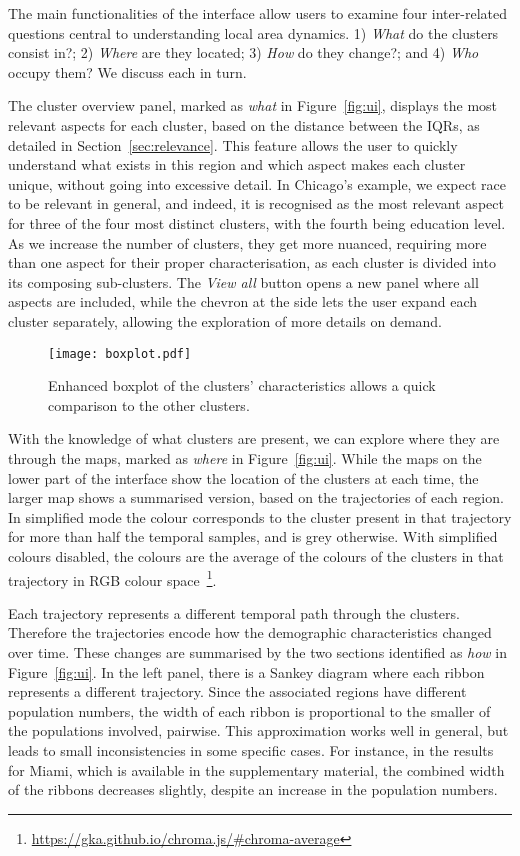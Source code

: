 The main functionalities of the interface allow users to examine four
inter-related questions central to understanding local area dynamics. 1)
\emph{What} do the clusters consist in?; 2) \emph{Where} are they located; 3)
\emph{How} do they change?; and 4) \emph{Who} occupy them? We discuss each in
turn.  

The cluster overview panel, marked as \emph{what} in Figure~\ref{fig:ui},
displays the most relevant aspects for each cluster, based on the distance
between the IQRs, as detailed in Section~\ref{sec:relevance}. This
feature allows the user to quickly understand what exists in this region and
which aspect makes each cluster unique, without going into excessive detail. In
Chicago's example, we expect race to be relevant in general, and indeed, it is
recognised as the most relevant aspect for three of the four most distinct
clusters, with the fourth being education level. As we increase the number of
clusters, they get more nuanced, requiring more than one aspect for their proper
characterisation, as each cluster is divided into its composing sub-clusters.
The \emph{View all} button opens a new panel where all aspects are included,
while the chevron at the side lets the user expand each cluster separately,
allowing the exploration of more details on demand.


\begin{figure}
    \centering 
    \texttt{[image: boxplot.pdf]}
    \caption{Enhanced boxplot of the clusters' characteristics allows a quick
    comparison to the other clusters.\label{fig:boxplot}}
\end{figure}


With the knowledge of what clusters are present, we can explore where they are
through the maps, marked as \emph{where} in Figure~\ref{fig:ui}. While the maps
on the lower part of the interface show the location of the clusters at each
time, the larger map shows a summarised version, based on the trajectories of
each region. In simplified mode the colour corresponds to the
cluster present in that trajectory for more than half the temporal samples, and
is grey otherwise. With simplified colours disabled, the colours are the average
of the colours of the clusters in that trajectory in RGB colour
space~\footnote{\url{https://gka.github.io/chroma.js/\#chroma-average}}.

Each trajectory represents a different temporal path through the clusters.
Therefore the trajectories encode how the demographic characteristics changed
over time. These changes are summarised by the two sections identified as
\emph{how} in Figure~\ref{fig:ui}. In the left panel, there is a Sankey diagram
where each ribbon represents a different trajectory. Since the associated
regions have different population numbers, the width of each ribbon is
proportional to the smaller of the populations involved, pairwise. This
approximation works well in general, but leads to small inconsistencies in some
specific cases. For instance, in the results for Miami, which is available in
the supplementary material, the combined width of the ribbons decreases
slightly, despite an increase in the population numbers.

